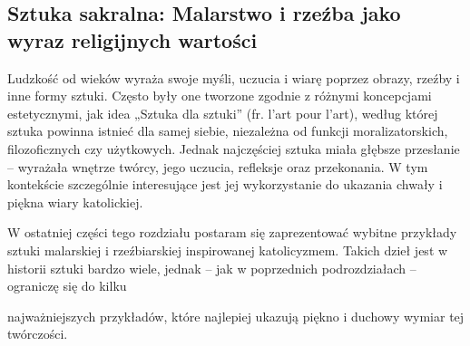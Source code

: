 \subsection{Sztuka sakralna: Malarstwo i rzeźba jako wyraz religijnych wartości}

Ludzkość od wieków wyraża swoje myśli, uczucia i wiarę poprzez obrazy, rzeźby i
inne formy sztuki. Często były one tworzone zgodnie z różnymi koncepcjami estetycznymi,
jak idea „Sztuka dla sztuki” (fr. l’art pour l’art), według której sztuka powinna istnieć dla
samej siebie, niezależna od funkcji moralizatorskich, filozoficznych czy użytkowych.
Jednak najczęściej sztuka miała głębsze przesłanie – wyrażała wnętrze twórcy, jego
uczucia, refleksje oraz przekonania. W tym kontekście szczególnie interesujące jest jej
wykorzystanie do ukazania chwały i piękna wiary katolickiej.

W ostatniej części tego rozdziału postaram się zaprezentować wybitne przykłady
sztuki malarskiej i rzeźbiarskiej inspirowanej katolicyzmem. Takich dzieł jest w historii
sztuki bardzo wiele, jednak – jak w poprzednich podrozdziałach – ograniczę się do kilku

najważniejszych przykładów, które najlepiej ukazują piękno i duchowy wymiar tej
twórczości.